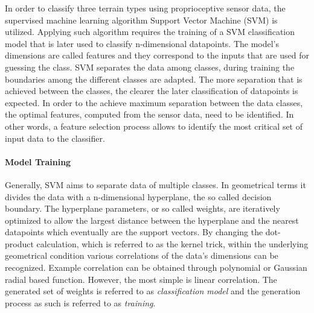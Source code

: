 \documentclass{article}
\begin{document}
In order to classify three terrain types using proprioceptive sensor data, the supervised machine learning algorithm Support Vector Machine (SVM) is utilized. 
Applying such algorithm requires the training of a SVM classification model that is later used to classify n-dimensional datapoints.
The model's dimensions are called features and they correspond to the inputs that are used for guessing the class. 
SVM separates the data among classes, during training the boundaries among the different classes are adapted. 
The more separation that is achieved between the classes, the clearer the later classification of datapoints is expected. 
In order to the achieve maximum separation between the data classes, the optimal features, computed from the sensor data, need to be identified. 
In other words, a feature selection process allows to identify the most critical set of input data to the classifier. 

\paragraph*{Model Training}
Generally, SVM aims to separate data of multiple classes. 
In geometrical terms it divides the data with a n-dimensional hyperplane, the so called decision boundary. 
The hyperplane parameters, or so called weights, are iteratively optimized to allow the largest distance between the hyperplane and the nearest datapoints which eventually are the support vectors.  
By changing the dot-product calculation, which is referred to as the kernel trick, within the underlying geometrical condition various correlations of the data's dimensions can be recognized. 
Example correlation can be obtained through polynomial or Gaussian radial based function.
However, the most simple is linear correlation.
The generated set of weights is referred to as \emph{classification model} and the generation process as such is referred to as \emph{training}.%



\end{document}
